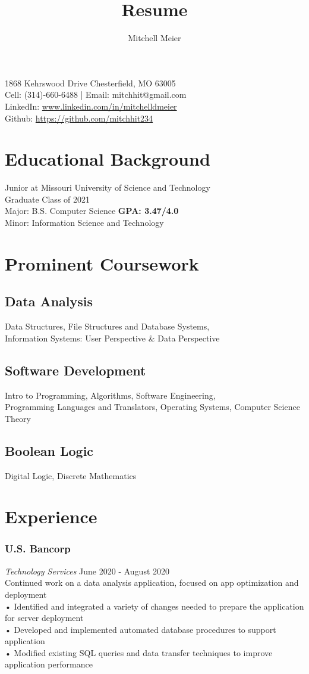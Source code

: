 \documentclass[11pt]{article}
\makeatletter
\renewcommand{\maketitle}{
\begin{center}
{\huge\bfseries
\theauthor}
 \vspace{.25em}

1868 Kehrswood Drive Chesterfield, MO 63005 \\
Cell: (314)-660-6488 | Email: mitchhit@gmail.com \\
LinkedIn: \url{www.linkedin.com/in/mitchelldmeier} \\
Github: \url{https://github.com/mitchhit234} \\
\end{center}
}
\makeatother
\begin{document}
\title{Resume}
\author{Mitchell Meier}
\maketitle



\section{Educational Background}
Junior at Missouri University of Science and Technology \\
Graduate Class of 2021 \\
Major: B.S. Computer Science \hspace*{\fill} \textbf{GPA: 3.47/4.0} \\
Minor: Information Science and Technology

\section{Prominent Coursework}

\subsection{Data Analysis}
Data Structures, File Structures and Database Systems, \\
Information Systems: User Perspective \& Data Perspective
\subsection{Software Development}     
Intro to Programming, Algorithms, Software Engineering, \\ Programming Languages and Translators, Operating Systems, Computer Science Theory
\subsection{Boolean Logic}
Digital Logic, Discrete Mathematics

\section{Experience} 

\subsubsection{U.S. Bancorp} 
\hspace{.2in} \textit{Technology Services} \hspace*{\fill} June 2020 - August 2020 \\
Continued work on a data analysis application, focused on app optimization and deployment \\
• Identified and integrated a variety of changes needed to prepare the application for server deployment \\
• Developed and implemented automated database procedures to support application \\
• Modified existing SQL queries and data transfer techniques to improve application performance 
\end{document}
